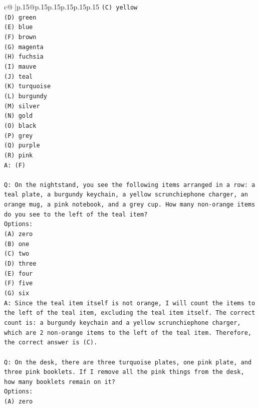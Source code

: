 \documentclass{article}
\begin{document}
{\begin{supertabular}{c@{$\;$}|p{.15\linewidth}@{}p{.15\linewidth}p{.15\linewidth}p{.15\linewidth}p{.15\linewidth}p{.15\linewidth}}
{{{\texttt{(C) yellow} \\
\texttt{(D) green} \\
\texttt{(E) blue} \\
\texttt{(F) brown} \\
\texttt{(G) magenta} \\
\texttt{(H) fuchsia} \\
\texttt{(I) mauve} \\
\texttt{(J) teal} \\
\texttt{(K) turquoise} \\
\texttt{(L) burgundy} \\
\texttt{(M) silver} \\
\texttt{(N) gold} \\
\texttt{(O) black} \\
\texttt{(P) grey} \\
\texttt{(Q) purple} \\
\texttt{(R) pink} \\
\texttt{A: (F)} \\
\\ 
\texttt{Q: On the nightstand, you see the following items arranged in a row: a teal plate, a burgundy keychain, a yellow scrunchiephone charger, an orange mug, a pink notebook, and a grey cup. How many non{-}orange items do you see to the left of the teal item?} \\
\texttt{Options:} \\
\texttt{(A) zero} \\
\texttt{(B) one} \\
\texttt{(C) two} \\
\texttt{(D) three} \\
\texttt{(E) four} \\
\texttt{(F) five} \\
\texttt{(G) six} \\
\texttt{A: Since the teal item itself is not orange, I will count the items to the left of the teal item, excluding the teal item itself. The correct count is: a burgundy keychain and a yellow scrunchiephone charger, which are 2 non{-}orange items to the left of the teal item. Therefore, the correct answer is (C).} \\
\\ 
\texttt{Q: On the desk, there are three turquoise plates, one pink plate, and three pink booklets. If I remove all the pink things from the desk, how many booklets remain on it?} \\
\texttt{Options:} \\
\texttt{(A) zero} \\
}}}
\end{supertabular}}
\end{document}
